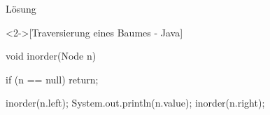 \begin{frame}[fragile,c]{Lösung}
    \begin{solve}<2->[Traversierung eines Baumes - Java]
\begin{plainjava}
void inorder(Node n)  {
    if (n == null) return;

    inorder(n.left);
    System.out.println(n.value);
    inorder(n.right);
}
\end{plainjava}
    \end{solve}
\end{frame}
\fi
